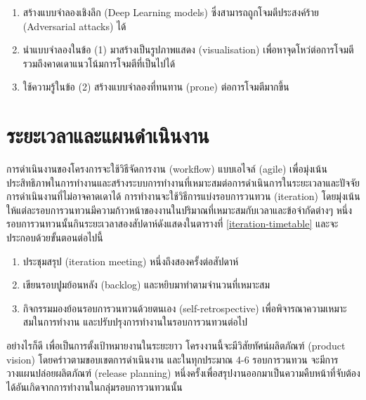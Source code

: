 \documentclass{cpereport}
\begin{document}
\begin{enumerate}
    \item สร้างแบบจำลองเชิงลึก (Deep Learning models) ซึ่งสามารถถูกโจมตีประสงค์ร้าย (Adversarial attacks) ได้
    \item นำแบบจำลองในข้อ (1) มาสร้างเป็นรูปภาพแสดง (visualisation) เพื่อหาจุดโหว่ต่อการโจมตี รวมถึงคาดเดาแนวโน้มการโจมตีที่เป็นไปได้
    \item ใช้ความรู้ในข้อ (2) สร้างแบบจำลองที่ทนทาน (prone) ต่อการโจมตีมากขึ้น
\end{enumerate}

\section{ระยะเวลาและแผนดําเนินงาน}
การดำเนินงานของโครงการจะใช้วิธีจัดการงาน (workflow) แบบเอไจล์ (agile) เพื่อมุ่งเน้นประสิทธิภาพในการทำงานและสร้างระบบการทำงานที่เหมาะสมต่อการดำเนินการในระยะเวลาและปัจจัยการดำเนินงานที่ไม่อาจคาดเดาได้
การทำงานจะใช้วิธีการแบ่งรอบการวนทวน (iteration) โดยมุ่งเน้นให้แต่ละรอบการวนทวนมีความก้าวหน้าของงานในปริมาณที่เหมาะสมกับเวลาและข้อจำกัดต่างๆ
หนึ่งรอบการวนทวนนั้นกินระยะเวลาสองสัปดาห์ดังแสดงในตารางที่ \ref{iteration-timetable} และจะประกอบด้วยขั้นตอนต่อไปนี้
\begin{enumerate}
    \item ประชุมสรุป (iteration meeting) หนึ่งถึงสองครั้งต่อสัปดาห์
    \item เขียนรอบปูมย้อนหลัง (backlog) และหยิบมาทำตามจำนวนที่เหมาะสม
    \item กิจกรรมมองย้อนรอบการวนทวนด้วยตนเอง (self-retrospective) เพื่อพิจารณาความเหมาะสมในการทำงาน และปรับปรุงการทำงานในรอบการวนทวนต่อไป
\end{enumerate}
อย่างไรก็ดี เพื่อเป็นการตั้งเป้าหมายงานในระยะยาว โครงงานนี้จะมีวิสัยทัศน์ผลิตภัณฑ์ (product vision) โดยคร่าวตามขอบเขตการดำเนินงาน และในทุกประมาณ 4-6 รอบการวนทวน จะมีการวางแผนปล่อยผลิตภัณฑ์ (release planning) หนึ่งครั้งเพื่อสรุปงานออกมาเป็นความคืบหน้าที่จับต้องได้อันเกิดจากการทำงานในกลุ่มรอบการวนทวนนั้น
\end{document}
